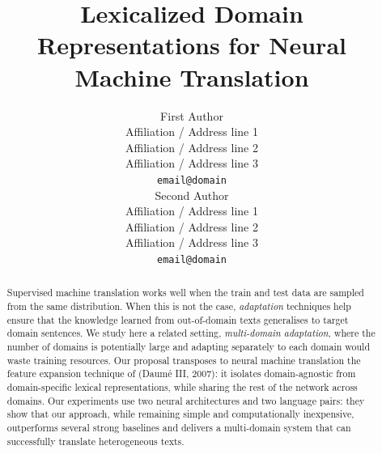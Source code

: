 \documentclass[11pt,a4paper]{article}
\title{Lexicalized Domain Representations for Neural Machine Translation}
\author{First Author \\%
  Affiliation / Address line 1 \\
  Affiliation / Address line 2 \\
  Affiliation / Address line 3 \\
  {\tt email@domain} \\\And
  Second Author \\
  Affiliation / Address line 1 \\
  Affiliation / Address line 2 \\
  Affiliation / Address line 3 \\
  {\tt email@domain} \\}
\date{}
\newcommand{\fyTodo}[1]{\Todo[FY:]{\textcolor{orange}{#1}}}
\newcommand{\fyDone}[1]{\done[FY]\Todo[FY:]{\textcolor{orange}{#1}}}
\begin{document}
\maketitle

\fyDone{s/naacl/EMNLP/g}
\fyDone{Too long, selfcontained, noref, rewrite}
\begin{abstract}
  Supervised machine translation works well when the train and test data are sampled from the same distribution.
  When this is not the case, \emph{adaptation} techniques help ensure that the knowledge learned from out-of-domain texts generalises to target domain sentences.
  We study here a related setting, \emph{multi-domain adaptation}, where the number of domains is potentially large and adapting separately to each domain would waste training resources.
  Our proposal transposes to neural machine translation the feature expansion technique of (Daum\'e III, 2007): it isolates domain-agnostic from domain-specific lexical representations, while sharing the rest of the network across domains.
  Our experiments use two neural architectures and two language pairs: they show that our approach, while remaining simple and computationally inexpensive, outperforms several strong baselines and delivers a multi-domain system that can successfully translate heterogeneous texts.

\end{abstract}
\end{document}
